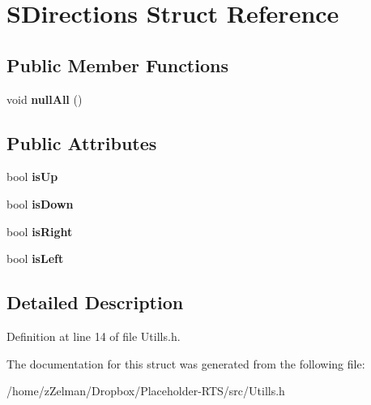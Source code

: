 \hypertarget{structSDirections}{\section{S\-Directions Struct Reference}
\label{structSDirections}
}
\subsection*{Public Member Functions}
\begin{DoxyCompactItemize}
\item 
\hypertarget{structSDirections_ac29ebce1f36f46d6ed11655f6aea558b}{void {\bfseries null\-All} ()}\label{structSDirections_ac29ebce1f36f46d6ed11655f6aea558b}

\end{DoxyCompactItemize}
\subsection*{Public Attributes}
\begin{DoxyCompactItemize}
\item 
\hypertarget{structSDirections_a13276058d947f3d0805e5ecf5de6d13b}{bool {\bfseries is\-Up}}\label{structSDirections_a13276058d947f3d0805e5ecf5de6d13b}

\item 
\hypertarget{structSDirections_a46c253e1b84ad842d9a13f4c6e44921a}{bool {\bfseries is\-Down}}\label{structSDirections_a46c253e1b84ad842d9a13f4c6e44921a}

\item 
\hypertarget{structSDirections_a572463d0e9a4946b3b8c5bcc29ef925c}{bool {\bfseries is\-Right}}\label{structSDirections_a572463d0e9a4946b3b8c5bcc29ef925c}

\item 
\hypertarget{structSDirections_ab9aa738b0d93f98da0aa97ed97122fef}{bool {\bfseries is\-Left}}\label{structSDirections_ab9aa738b0d93f98da0aa97ed97122fef}

\end{DoxyCompactItemize}


\subsection{Detailed Description}


Definition at line 14 of file Utills.\-h.



The documentation for this struct was generated from the following file\-:\begin{DoxyCompactItemize}
\item 
/home/z\-Zelman/\-Dropbox/\-Placeholder-\/\-R\-T\-S/src/Utills.\-h\end{DoxyCompactItemize}
